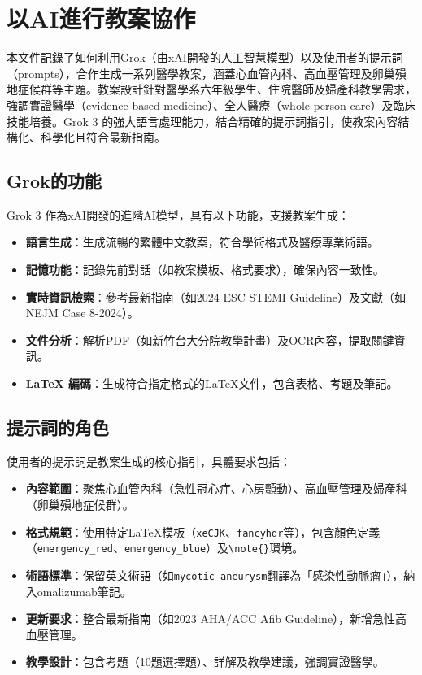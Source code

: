 \documentclass[12pt,a4paper]{article}
\begin{document}
\section{以AI進行教案協作}
本文件記錄了如何利用Grok（由xAI開發的人工智慧模型）以及使用者的提示詞（prompts），合作生成一系列醫學教案，涵蓋心血管內科、高血壓管理及卵巢殞地症候群等主題。教案設計針對醫學系六年級學生、住院醫師及婦產科教學需求，強調實證醫學（evidence-based medicine）、全人醫療（whole person care）及臨床技能培養。Grok 3 的強大語言處理能力，結合精確的提示詞指引，使教案內容結構化、科學化且符合最新指南。

\vspace{0.5cm}

\subsection{Grok的功能}
Grok 3 作為xAI開發的進階AI模型，具有以下功能，支援教案生成：
\begin{itemize}[nosep]
    \item \textbf{語言生成}：生成流暢的繁體中文教案，符合學術格式及醫療專業術語。
    \item \textbf{記憶功能}：記錄先前對話（如教案模板、格式要求），確保內容一致性。
    \item \textbf{實時資訊檢索}：參考最新指南（如2024 ESC STEMI Guideline）及文獻（如NEJM Case 8-2024）。
    \item \textbf{文件分析}：解析PDF（如新竹台大分院教學計畫）及OCR內容，提取關鍵資訊。
    \item \textbf{LaTeX 編碼}：生成符合指定格式的LaTeX文件，包含表格、考題及筆記。
\end{itemize}

\subsection{提示詞的角色}
使用者的提示詞是教案生成的核心指引，具體要求包括：
\begin{itemize}[nosep]
    \item \textbf{內容範圍}：聚焦心血管內科（急性冠心症、心房顫動）、高血壓管理及婦產科（卵巢殞地症候群）。
    \item \textbf{格式規範}：使用特定LaTeX模板（\texttt{xeCJK}、\texttt{fancyhdr}等），包含顏色定義（\texttt{emergency_red}、\texttt{emergency_blue}）及\verb|\note{}|環境。
    \item \textbf{術語標準}：保留英文術語（如\texttt{mycotic aneurysm}翻譯為「感染性動脈瘤」），納入omalizumab筆記。
    \item \textbf{更新要求}：整合最新指南（如2023 AHA/ACC Afib Guideline），新增急性高血壓管理。
    \item \textbf{教學設計}：包含考題（10題選擇題）、詳解及教學建議，強調實證醫學。
\end{itemize}
\end{document}

